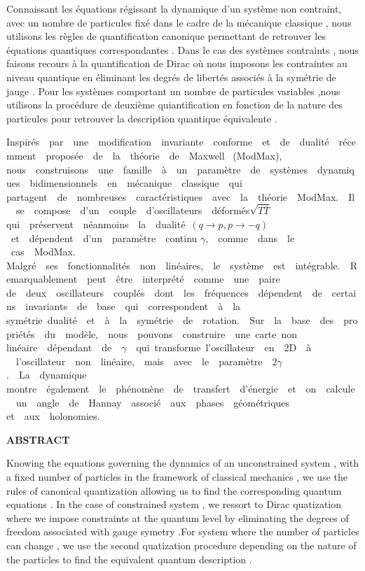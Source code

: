 \documentclass[12pt,a4paper, openany]{article}
\begin{document}
 Connaissant les équations régissant la dynamique d'un système non contraint, avec un nombre de particules fixé dans le cadre de la mécanique classique ,  nous utilisons les règles de quantification canonique permettant de retrouver les équations quantiques correspondantes .	Dans le cas des systèmes contraints , nous faisons recours à la quantification de Dirac  où nous imposons les contraintes au niveau quantique en éliminant les degrés de libertés associés à la symétrie de jauge .  Pour les systèmes comportant un nombre de particules variables ,nous utilisons la procédure de deuxième quiantification en fonction de la nature des particules pour retrouver la description quantique équivalente . 

Inspirés  par  une  modification  invariante  conforme  et  de  dualité  récemment  proposée  de  la  théorie  de  Maxwell  (ModMax),   nous  construisons  une  famille  à  un  paramètre  de  systèmes  dynamiques  bidimensionnels  en  mécanique  classique  qui   partagent  de  nombreuses  caractéristiques  avec  la  théorie  ModMax.  Il  se  compose  d'un  couple  d'oscillateurs  déformés$\sqrt{T\overline{T}}$ qui  préservent  néanmoins  la  dualité $ \left(q\rightarrow {p}, p\rightarrow {-q}\right) $ et  dépendent  d'un  paramètre  continu $\gamma$,  comme  dans  le \\ cas  ModMax.   Malgré  ses  fonctionnalités  non  linéaires,  le  système  est  intégrable.  Remarquablement  peut  être  interprété  comme  une  paire   de  deux  oscillateurs  couplés  dont  les  fréquences  dépendent  de  certains  invariants  de  base  qui  correspondent  à  la  symétrie dualité  et  à  la  symétrie  de  rotation.  Sur  la  base  des  propriétés  du  modèle,  nous  pouvons  construire  une carte non   linéaire  dépendant  de  $\gamma$  qui transforme l'oscillateur  en  2D  à\\  l'oscillateur  non  linéaire,  mais  avec  le  paramètre  2$\gamma$.  La  dynamique   montre  également  le  phénomène  de  transfert  d'énergie  et  on  calcule  un  angle  de  Hannay  associé  aux  phases  géométriques   et  aux  holonomies.
\newpage
\begin{center}
\textbf{ABSTRACT}	
\end{center}

Knowing the equations governing the dynamics of an unconstrained system , with a fixed number of particles in the framework of classical mechanics , we use the rules of canonical quantization allowing us to find the corresponding quantum equations . In the case of constrained system , we ressort to Dirac quatization where we impose constraints at the quantum level by eliminating the degrees of freedom associated with gauge symetry .For system where the number of particles can change , we use the second quatization procedure depending on the nature of the particles to find the equivalent quantum description . 
\end{document}
